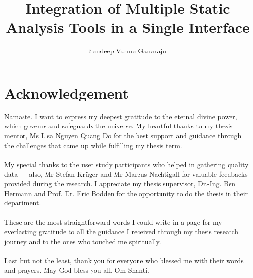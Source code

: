 \documentclass[]{upb_cs_thesis} %
\title{Integration of Multiple Static Analysis Tools in a Single Interface}
\author{Sandeep Varma Ganaraju}
\begin{document}
\let\cleardoublepage\clearpage
\clearpage

\chapter*{Acknowledgement}


\vspace*{\fill}
Namaste. I want to express my deepest gratitude to the eternal divine power, which governs and safeguards the universe. My heartful thanks to my thesis mentor, Ms Lisa Nguyen Quang Do for the best support and guidance through the challenges that came up while fulfilling my thesis term. \\ \\

My special thanks to the user study participants who helped in gathering quality data — also, Mr Stefan Krüger and Mr Marcus Nachtigall for valuable feedbacks provided during the research. I appreciate my thesis supervisor, Dr.-Ing. Ben Hermann and Prof. Dr. Eric Bodden for the opportunity to do the thesis in their department. \\ \\

These are the most straightforward words I could write in a page for my everlasting gratitude to all the guidance I received through my thesis research journey and to the ones who touched me spiritually. \\ \\

Last but not the least, thank you for everyone who blessed me with their words and prayers. May God bless you all. Om Shanti. \\ \\ \\ \\


\vspace*{\fill}
%

\clearpage

\vspace*{\fill}
\begin{abstract}
	
\end{abstract}
\acresetall
\vspace*{\fill}
\let\cleardoublepage\clearpage
\end{document}
